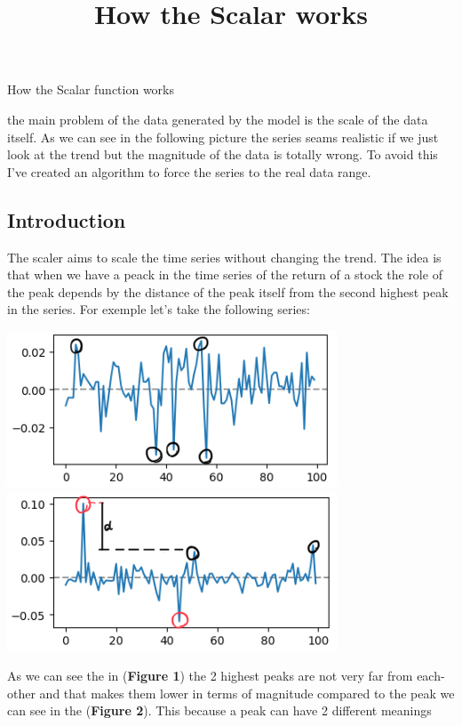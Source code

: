 \documentclass{article}
\title{How the Scalar works}
\begin{document}
\begin{center}
    {\huge{How the Scalar function works}}
\end{center}    
    \begin{multicols}{2}
    the main problem of the data generated by the model is the scale of the data itself.
    As we can see in the following picture the series seams realistic if we just look at the trend
    but the magnitude of the data is totally wrong. To avoid this I've created an algorithm to force
    the series to the real data range.
    \subsection*{Introduction}
    The scaler aims to scale the time series without changing the trend. The idea is that when we have 
    a peack in the time series of the return of a stock the role of the peak depends by the distance of the 
    peak itself from the second highest peak in the series. For exemple let's take the following series:\\
    \begin{center}
        \includegraphics[scale = 0.7]{imgs/small_peaks.png}
        \includegraphics[scale = 0.7]{imgs/big_peaks.png}\\
    \end{center}
    As we can see the in (\textbf{Figure 1}) the 2 highest peaks are not very far from each-other and that makes them 
    lower in terms of magnitude compared to the peak we can see in the (\textbf{Figure 2}). This because a peak can have 2 different meanings 

\end{multicols}
\end{document}
